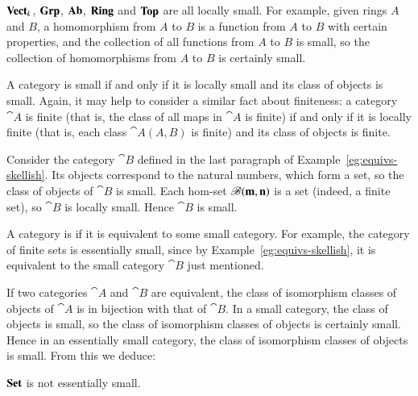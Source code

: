 \begin{example}
%
%
%
%
% 
%
$\mathbf{Vect}_k$, $\mathbf{Grp}$, $\mathbf{Ab}$, $\mathbf{Ring}$ and $\mathbf{Top}$ are all locally small.  For
example, given rings $A$ and $B$, a homomorphism from $A$ to $B$ is a
function from $A$ to $B$ with certain properties, and the collection of all
functions from $A$ to $B$ is small, so the collection of homomorphisms from
$A$ to $B$ is certainly small.
\end{example}

A category is small if and only if it is locally small and its class of
objects is small.  Again, it may help to consider a similar fact about
finiteness: a category $\cat{A}$ is finite (that is, the class of all maps
in $\cat{A}$ is finite) if and only if it is locally finite (that is, each
class $\cat{A}(A, B)$ is finite) and its class of objects is finite.

\begin{example}	
\label{eg:FinSet-skel}
Consider the category $\cat{B}$ defined in the last paragraph of 
Example~\ref{eg:equivs-skellish}.  Its objects correspond to the natural
numbers, which form a set, so the class of objects of $\cat{B}$ is small.
Each hom-set $\mathscr{B}(\mathbf{m}, \mathbf{n})$ is a set (indeed, a finite set),
so $\cat{B}$ is locally small.  Hence $\cat{B}$ is small.
\end{example}

A category is %
%
%
%
if it is equivalent to some small category.  For example, the category of
finite%
%
%
sets is essentially small, since by Example~\ref{eg:equivs-skellish}, it is
equivalent to the small category $\cat{B}$ just mentioned.

If two categories $\cat{A}$ and $\cat{B}$ are equivalent, the class of
isomorphism classes of objects of $\cat{A}$ is in bijection with that of
$\cat{B}$.  In a small category, the class of objects is small, so the
class of isomorphism classes of objects is certainly small.  Hence in an
essentially small category, the class of isomorphism classes of objects is
small.  From this we deduce:

\begin{propn}	
\label{propn:Set-large}
%
$\mathbf{Set}$ is not essentially small.
\end{propn}

